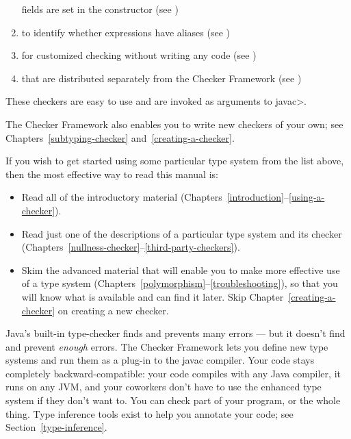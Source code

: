 \begin{enumerate}
  fields are set in the constructor (see
  )
\item
   to identify whether
  expressions have aliases (see )
\item
   for customized checking without
  writing any code (see )
\item
   that are distributed
  separately from the Checker Framework
  (see )

\end{enumerate}

\noindent
These checkers are easy to use and are invoked as arguments to \<javac>.


The Checker Framework also enables you to write new checkers of your
own; see Chapters~\ref{subtyping-checker} and~\ref{creating-a-checker}.



If you wish to get started using some particular type system from the list
above, then the most effective way to read this manual is:

\begin{itemize}
\item
  Read all of the introductory material
  (Chapters~\ref{introduction}--\ref{using-a-checker}).
\item
  Read just one of the descriptions of a particular type system and its
  checker (Chapters~\ref{nullness-checker}--\ref{third-party-checkers}).
\item
  Skim the advanced material that will enable you to make more effective
  use of a type system
  (Chapters~\ref{polymorphism}--\ref{troubleshooting}), so that you will
  know what is available and can find it later.  Skip
  Chapter~\ref{creating-a-checker} on creating a new checker.
\end{itemize}



Java's built-in type-checker finds and prevents many errors --- but it
doesn't find and prevent \emph{enough} errors.  The Checker Framework lets you
define new type systems and run them as a plug-in to the javac compiler.  Your
code stays completely backward-compatible:  your code compiles with any
Java compiler, it runs on any JVM, and your coworkers don't have to use the
enhanced type system if they don't want to.  You can check part of
your program, or the whole thing.  Type inference tools exist to help you annotate your
code; see Section~\ref{type-inference}.

